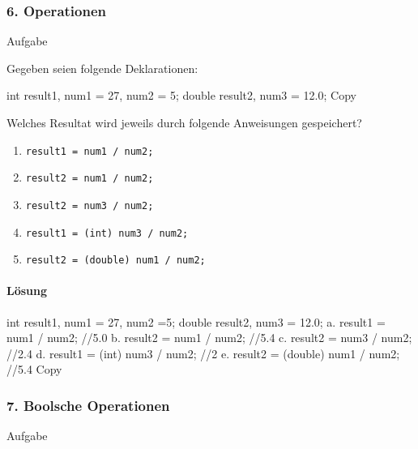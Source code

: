 \documentclass[
]{article}
\newenvironment{Shaded}{}{}
\newcommand{\NormalTok}[1]{#1}
\providecommand{\tightlist}{%
  \setlength{\itemsep}{0pt}\setlength{\parskip}{0pt}}
\begin{document}
\subsubsection{6. Operationen}\label{operationen}

Aufgabe

Gegeben seien folgende Deklarationen:

\begin{Shaded}
\begin{Highlighting}[]
\NormalTok{int result1, num1 = 27, num2 = 5;  }
\NormalTok{double result2, num3 = 12.0;  }
\NormalTok{Copy}
\end{Highlighting}
\end{Shaded}

Welches Resultat wird jeweils durch folgende Anweisungen gespeichert?

\begin{enumerate}
\tightlist
\item
  \texttt{result1\ =\ num1\ /\ num2;}
\item
  \texttt{result2\ =\ num1\ /\ num2;}
\item
  \texttt{result2\ =\ num3\ /\ num2;}
\item
  \texttt{result1\ =\ (int)\ num3\ /\ num2;}
\item
  \texttt{result2\ =\ (double)\ num1\ /\ num2;}
\end{enumerate}

\paragraph{Lösung}\label{luxf6sung-4}

\begin{Shaded}
\begin{Highlighting}[]
\NormalTok{int result1, num1 = 27, num2 =5;}
\NormalTok{double result2, num3 = 12.0;}
\NormalTok{a. result1 = num1 / num2; //5.0}
\NormalTok{b. result2 = num1 / num2; //5.4}
\NormalTok{c. result2 = num3 / num2; //2.4}
\NormalTok{d. result1 = (int) num3 / num2; //2}
\NormalTok{e. result2 = (double) num1 / num2; //5.4}
\NormalTok{Copy}
\end{Highlighting}
\end{Shaded}

\subsubsection{7. Boolsche Operationen}\label{boolsche-operationen}

Aufgabe
\end{document}
